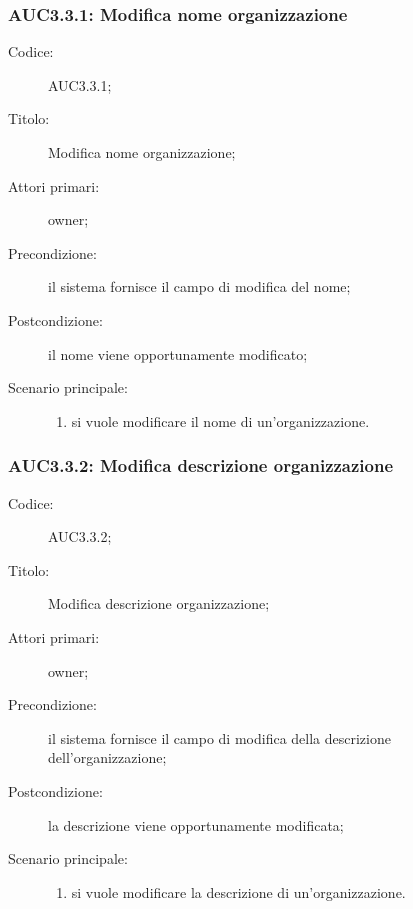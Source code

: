\documentclass[../../../analisi-dei-requisiti.tex]{subfiles}
\begin{document}
\subsubsection{AUC3.3.1: Modifica nome organizzazione}%
\label{subs:AUC3.3.1}
\begin{description}
  \item[Codice:] AUC3.3.1;
  \item[Titolo:] Modifica nome organizzazione;
  \item[Attori primari:] owner;
  \item[Precondizione:] il sistema fornisce il campo di modifica del nome;
  \item[Postcondizione:] il nome viene opportunamente modificato;
  \item[Scenario principale:]
        \begin{enumerate}
          \item si vuole modificare il nome di un'organizzazione.
        \end{enumerate}
\end{description}

\subsubsection{AUC3.3.2: Modifica descrizione organizzazione}%
\label{subs:AUC3.3.2}
\begin{description}
  \item[Codice:] AUC3.3.2;
  \item[Titolo:] Modifica descrizione organizzazione;
  \item[Attori primari:] owner;
  \item[Precondizione:] il sistema fornisce il campo di modifica della descrizione dell'organizzazione;
  \item[Postcondizione:] la descrizione viene opportunamente modificata;
  \item[Scenario principale:]
        \begin{enumerate}
          \item si vuole modificare la descrizione di un'organizzazione.
        \end{enumerate}
\end{description}
\end{document}
